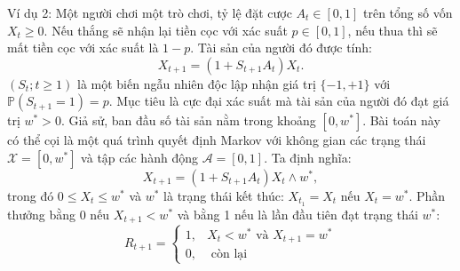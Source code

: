 \documentclass[14pt,a4paper,oneside]{report}		%
\begin{document}
Ví dụ 2: Một người chơi một trò chơi, tỷ lệ đặt cược $A_t \in [0,1]$ trên tổng số vốn $X_t \geq 0$. Nếu thắng sẽ nhận lại tiền cọc với xác suất $p\in [0,1]$, nếu thua thì sẽ mất tiền cọc với xác suất là $1-p$. Tài sản của người đó được tính:
$$X_{t+1}=(1+S_{t+1}A_t)X_t.$$
$(S_t;t\geq 1)$ là một biến ngẫu nhiên độc lập nhận giá trị $\{-1,+1\}$ với $\mathbb{P}(S_{t+1}=1)=p$. Mục tiêu là cực đại xác suất mà tài sản của người đó đạt giá trị $w^* >0$. Giả sử, ban đầu số tài sản nằm trong khoảng $[0,w^*]$. Bài toán này có thể cọi là một quá trình quyết định Markov với không gian các trạng thái $\mathcal{X}=[0,w^*]$ và tập các hành động $\mathcal{A}=[0,1].$ Ta định nghĩa:
\begin{equation} \label{eq5}
X_{t+1}=(1+S_{t+1}A_t)X_t\wedge w^*,
\end{equation}
trong đó $0\leq X_t \leq w^*$ và $w^*$ là trạng thái kết thúc: $X_{t_1}=X_t$ nếu $X_t=w^*$. Phần thưởng bằng 0 nếu $X_{t+1} < w^*$ và bằng 1 nếu là lần đầu tiên đạt trạng thái $w^*$:
$$R_{t+1} = \begin{cases} 1, & X_t < w^* \mbox{ và } X_{t+1} = w^* \\ 
0, & \mbox{ còn lại } \end{cases}$$
\end{document}
